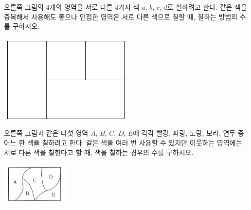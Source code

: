 \documentclass[a4paper]{oblivoir}
\begin{document}

%
\begin{minipage}{.65\textwidth}
\begin{Exercise}
오른쪽 그림의 4개의 영역을 서로 다른 4가지 색 \(a\), \(b\), \(c\), \(d\)로 칠하려고 한다.
같은 색을 중복해서 사용해도 좋으나 인접한 영역은 서로 다른 색으로 칠할 때, 칠하는 방법의 수를 구하시오.
\end{Exercise}
\end{minipage}
\quad
\begin{minipage}{.25\textwidth}
\includegraphics[width=.5\textwidth]{6}
\end{minipage}


%
\begin{minipage}{.65\textwidth}
\begin{Exercise}
오른쪽 그림과 같은 다섯 영역 \(A\), \(B\), \(C\), \(D\), \(E\)에 각각 빨강, 파랑, 노랑, 보라, 연두 중 어느 한 색을 칠하려고 한다.
같은 색을 여러 번 사용할 수 있지만 이웃하는 영역에는 서로 다른 색을 칠한다고 할 때, 색을 칠하는 경우의 수를 구하시오.
\end{Exercise}
\end{minipage}
\quad
\begin{minipage}{.25\textwidth}
\includegraphics[width=.5\textwidth]{7}
\end{minipage}

\end{document}
